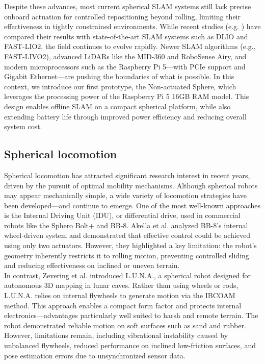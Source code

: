 \documentclass[conference]{IEEEtran}
\begin{document}
\hspace*{1em}Despite these advances, most current spherical SLAM systems still lack precise onboard actuation for controlled repositioning beyond rolling, limiting their effectiveness in tightly constrained environments. While recent studies (e.g. \cite{Kalman_filter_sphere}) have compared their results with state-of-the-art SLAM systems such as DLIO\cite{dlio} and FAST-LIO2\cite{fastlio2}, the field continues to evolve rapidly. Newer SLAM algorithms (e.g., FAST-LIVO2\cite{fastlivo2}), advanced LiDARs like the MID-360 and RoboSense Airy, and modern microprocessors such as the Raspberry Pi 5—with PCIe support and Gigabit Ethernet—are pushing the boundaries of what is possible. In this context, we introduce our first prototype, the Non-actuated Sphere, which leverages the processing power of the Raspberry Pi 5 16GB RAM model. This design enables offline SLAM on a compact spherical platform, while also extending battery life through improved power efficiency and reducing overall system cost.
\subsection{Spherical locomotion}

\label{sec:state-of-the-art}

Spherical locomotion has attracted significant research interest in recent years, driven by the pursuit of optimal mobility mechanisms. Although spherical robots may appear mechanically simple, a wide variety of locomotion strategies have been developed—and continue to emerge. One of the most well-known approaches is the Internal Driving Unit (IDU), or differential drive, used in commercial robots like the Sphero Bolt+ and BB-8. Akella et al.\cite{Sphero} analyzed BB-8’s internal wheel-driven system and demonstrated that effective control could be achieved using only two actuators. However, they highlighted a key limitation: the robot’s geometry inherently restricts it to rolling motion, preventing controlled sliding and reducing effectiveness on inclined or uneven terrain.\\

In contrast, Zevering et al.\cite{luna} introduced L.U.N.A., a spherical robot designed for autonomous 3D mapping in lunar caves. Rather than using wheels or rods, L.U.N.A. relies on internal flywheels to generate motion via the IBCOAM method. This approach enables a compact form factor and protects internal electronics—advantages particularly well suited to harsh and remote terrain. The robot demonstrated reliable motion on soft surfaces such as sand and rubber. However, limitations remain, including vibrational instability caused by unbalanced flywheels, reduced performance on inclined low-friction surfaces, and pose estimation errors due to unsynchronized sensor data.\\
\end{document}
